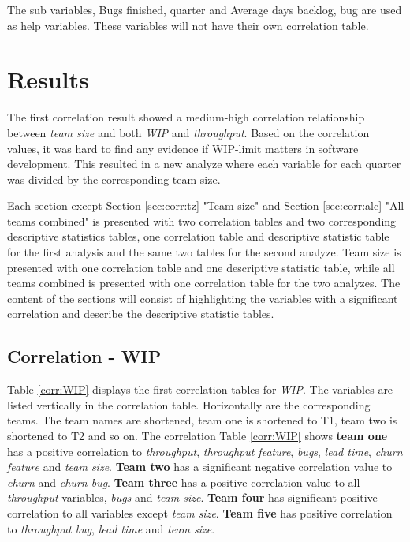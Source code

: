 \documentclass[UKenglish]{ifimaster}  %
\begin{document}
The sub variables, Bugs finished, quarter and Average days backlog, bug are used as help variables. These variables will not have their own correlation table. 



\chapter{Results}                     
\label{ch:res}
The first correlation result showed a medium-high correlation relationship between \textit{team size} and both \textit{WIP} and \textit{throughput}. Based on the correlation values, it was hard to find any evidence if WIP-limit matters in software development. This resulted in a new analyze where each variable for each quarter was divided by the corresponding team size. 

Each section except Section \ref{sec:corr:tz} "Team size"  and Section \ref{sec:corr:alc} "All teams combined" is presented with two correlation tables and two corresponding descriptive statistics tables, one correlation table and descriptive statistic table for the first analysis and the same two tables for the second analyze. {Team size} is presented with one correlation table and one descriptive statistic table, while all teams combined is presented  with one correlation table for the two analyzes. The content of the sections will consist of highlighting the variables with a significant correlation and describe the descriptive statistic tables.
\section{Correlation - WIP}
\label{sec:corr:WIP}
Table \ref{corr:WIP} displays the first correlation tables for \textit{WIP}. The variables are listed vertically in the correlation table. Horizontally are the corresponding teams. The team names are shortened, team one is shortened to T1, team two is shortened to T2 and so on.
The correlation Table \ref{corr:WIP} shows \textbf{team one} has a positive correlation to \textit{throughput}, \textit{throughput feature}, \textit{bugs}, \textit{lead time}, \textit{churn feature} and \textit{team size}. \textbf{Team two} has a significant negative correlation value to \textit{churn} and \textit{churn bug}. \textbf{Team three} has a positive correlation value to all \textit{throughput} variables, \textit{bugs} and \textit{team size}. \textbf{Team four} has significant positive correlation to all variables except \textit{team size}. \textbf{Team five} has positive correlation to \textit{throughput bug}, \textit{lead time} and \textit{team size}.
\end{document}
